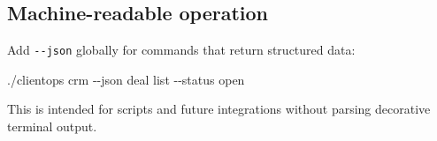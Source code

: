 \documentclass[
]{article}
\newenvironment{Shaded}{}{}
\newcommand{\AttributeTok}[1]{\textcolor[rgb]{0.49,0.56,0.16}{#1}}
\newcommand{\ExtensionTok}[1]{#1}
\newcommand{\NormalTok}[1]{#1}
\begin{document}
\subsection{Machine-readable
operation}\label{machine-readable-operation}

Add \texttt{-\/-json} globally for commands that return structured data:

\begin{Shaded}
\begin{Highlighting}[]
\ExtensionTok{./clientops}\NormalTok{ crm }\AttributeTok{{-}{-}json}\NormalTok{ deal list }\AttributeTok{{-}{-}status}\NormalTok{ open}
\end{Highlighting}
\end{Shaded}

This is intended for scripts and future integrations without parsing
decorative terminal output.
\end{document}
